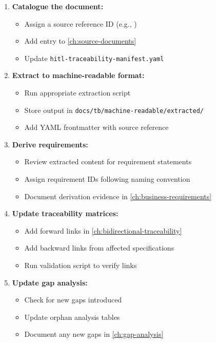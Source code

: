 \begin{enumerate}
  \item \textbf{Catalogue the document:}
        \begin{itemize}[noitemsep]
          \item Assign a source reference ID (e.g., )
          \item Add entry to \cref{ch:source-documents}
          \item Update \texttt{hitl-traceability-manifest.yaml}
        \end{itemize}
        
  \item \textbf{Extract to machine-readable format:}
        \begin{itemize}[noitemsep]
          \item Run appropriate extraction script
          \item Store output in \texttt{docs/tb/machine-readable/extracted/}
          \item Add YAML frontmatter with source reference
        \end{itemize}
        
  \item \textbf{Derive requirements:}
        \begin{itemize}[noitemsep]
          \item Review extracted content for requirement statements
          \item Assign requirement IDs following naming convention
          \item Document derivation evidence in \cref{ch:business-requirements}
        \end{itemize}
        
  \item \textbf{Update traceability matrices:}
        \begin{itemize}[noitemsep]
          \item Add forward links in \cref{ch:bidirectional-traceability}
          \item Add backward links from affected specifications
          \item Run validation script to verify links
        \end{itemize}
        
  \item \textbf{Update gap analysis:}
        \begin{itemize}[noitemsep]
          \item Check for new gaps introduced
          \item Update orphan analysis tables
          \item Document any new gaps in \cref{ch:gap-analysis}
        \end{itemize}
\end{enumerate}

